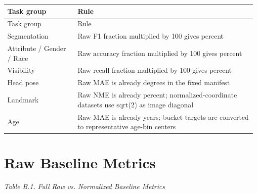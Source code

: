 \documentclass[11pt]{article}
\begin{document}
\begingroup
\scriptsize
\setlength{\tabcolsep}{3pt}
\begin{longtable}{@{}>{\RaggedRight\arraybackslash}p{}>{\RaggedRight\arraybackslash}p{}@{}}
\toprule
Task group & Rule \\
\midrule
\endfirsthead
\toprule
Task group & Rule \\
\midrule
\endhead
Segmentation & Raw F1 fraction multiplied by 100 gives percent \\
Attribute / Gender / Race & Raw accuracy fraction multiplied by 100 gives percent \\
Visibility & Raw recall fraction multiplied by 100 gives percent \\
Head pose & Raw MAE is already degrees in the fixed manifest \\
Landmark & Raw NME is already percent; normalized-coordinate datasets use sqrt(2) as image diagonal \\
Age & Raw MAE is already years; bucket targets are converted to representative age-bin centers \\
\bottomrule
\end{longtable}
\endgroup


\section{Raw Baseline Metrics}

\emph{Table B.1. Full Raw vs. Normalized Baseline Metrics}
\end{document}
